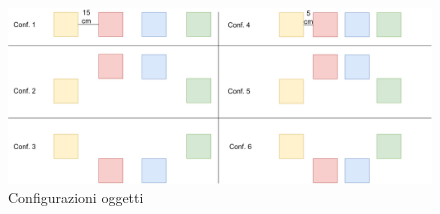 \begin{figure}[h]
    \centering
    \includegraphics[scale=0.5]{Figure/Image/configurazioni.png}
    \caption{Configurazioni oggetti}
    \label{fig:configurazioni}
\end{figure}